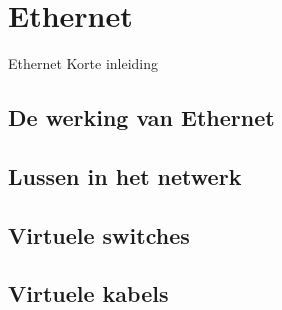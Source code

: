 \section{Ethernet}

\begin{frame}{Ethernet}
    Korte inleiding
\end{frame}

\subsection{De werking van Ethernet}

\begin{frame}
\end{frame}

\subsection{Lussen in het netwerk}

\begin{frame}
\end{frame}

\subsection{Virtuele switches}

\begin{frame}
\end{frame}

\subsection{Virtuele kabels}

\begin{frame}
\end{frame}
